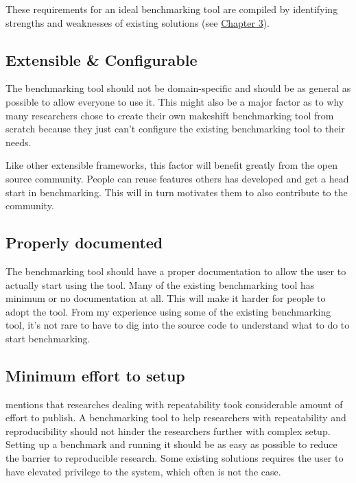 These requirements for an ideal benchmarking tool are compiled by identifying strengths and weaknesses of existing solutions (see \hyperref[ch:priorWorks]{Chapter 3}).

\subsection{Extensible \& Configurable}
The benchmarking tool should not be domain-specific and should be as general as possible to allow everyone to use it.
This might also be a major factor as to why many researchers chose to create their own makeshift benchmarking tool from scratch because they just can't configure the existing benchmarking tool to their needs.

Like other extensible frameworks, this factor will benefit greatly from the open source community. People can reuse features others has developed and get a head start in benchmarking. This will in turn motivates them to also contribute to the community.

\subsection{Properly documented}
The benchmarking tool should have a proper documentation to allow the user to actually start using the tool.
Many of the existing benchmarking tool has minimum or no documentation at all.
This will make it harder for people to adopt the tool.
From my experience using some of the existing benchmarking tool, it's not rare to have to dig into the source code to understand what to do to start benchmarking.

\subsection{Minimum effort to setup}
\citet{vitekR3RepeatabilityReproducibility2012} mentions that researches dealing with repeatability took considerable amount of effort to publish.
A benchmarking tool to help researchers with repeatability and reproducibility should not hinder the researchers further with complex setup.
Setting up a benchmark and running it should be as easy as possible to reduce the barrier to reproducible research.
Some existing solutions requires the user to have elevated privilege to the system, which often is not the case.

